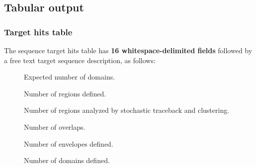 \begin{description}



\subsection{Tabular output}

\subsubsection{Target hits table}

The sequence target hits table has \textbf{16 whitespace-delimited
  fields} followed by a free text target sequence description, as
follows:

\begin{description}
\item[]

\item[] 

\item[] 

\item[] 

\item[] 

\item[] 

\item[] 

\item[] 

\item[] Expected number of domains.

\item[] Number of regions defined.

\item[]  
  Number of regions analyzed by stochastic traceback and clustering.

\item[] 
  Number of overlaps.

\item[] 
  Number of envelopes defined.

\item[] 
  Number of domains defined.


\end{description}
\end{description}

